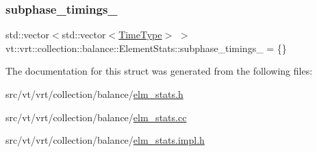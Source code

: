 \subsubsection{\texorpdfstring{subphase\+\_\+timings\+\_\+}{subphase\_timings\_}}
{\footnotesize\ttfamily std\+::vector$<$std\+::vector$<$\hyperlink{namespacevt_a876a9d0cd5a952859c72de8a46881442}{Time\+Type}$>$ $>$ vt\+::vrt\+::collection\+::balance\+::\+Element\+Stats\+::subphase\+\_\+timings\+\_\+ = \{\}\hspace{0.3cm}{\ttfamily [protected]}}



The documentation for this struct was generated from the following files\+:\begin{DoxyCompactItemize}
\item 
src/vt/vrt/collection/balance/\hyperlink{elm__stats_8h}{elm\+\_\+stats.\+h}\item 
src/vt/vrt/collection/balance/\hyperlink{elm__stats_8cc}{elm\+\_\+stats.\+cc}\item 
src/vt/vrt/collection/balance/\hyperlink{elm__stats_8impl_8h}{elm\+\_\+stats.\+impl.\+h}\end{DoxyCompactItemize}
